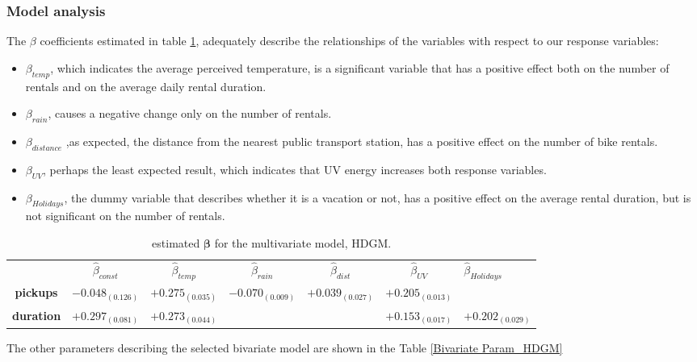 \subsubsection{Model analysis} 
The $\beta$ coefficients estimated in table \ref*{Bivariate Beta HDGM},
adequately describe the relationships of the variables with respect to our response variables:
\begin{itemize}
	\item $\beta_{temp}$, which indicates the average perceived temperature, is a significant variable that has a positive effect both on the number of rentals and on the average daily rental duration.
	\item $\beta_{rain}$, causes a negative change only on the number of rentals.
	\item $\beta_{distance}$ ,as expected, the distance from the nearest public transport station, has a positive effect on the number of bike rentals.
	\item $\beta_{UV}$, perhaps the least expected result, which indicates that UV energy increases both response variables.
	\item $\beta_{Holidays}$, the dummy variable that describes whether it is a vacation or not, has a positive effect on the average rental duration, but is not significant on the number of rentals.
\end{itemize}
\begin{table}[h!]
	\centering
	\renewcommand\arraystretch{1.3}
	\begin{tabular}{|ccccccl}
		\hline
		& $\hat{\beta}_{const}$  & $\hat{\beta}_{temp}$ & $\hat{\beta}_{rain}$ & $\hat{\beta}_{dist}$ & $\hat{\beta}_{UV}$ &$\hat{\beta}_{Holidays}$      \\ \cline{2-7} 
		\multicolumn{1}{|c|}{\textbf{pickups}}  & $-0.048_{(0.126)}$ & $+0.275_{(0.035)}$ & $-0.070_{(0.009)}$ & $+0.039_{(0.027)}$ & $+0.205_{(0.013)}$ &              \\
		\multicolumn{1}{|c|}{\textbf{duration}} & $+0.297_{(0.081)}$  & $+0.273_{(0.044)}$ &               &               & $+0.153_{(0.017)}$  & $+0.202_{(0.029)}$
	\end{tabular}
	\caption[Estimated $\boldsymbol{\beta}$ for the multivariate model (HDGM)]{estimated $\boldsymbol{\beta}$ for the multivariate model, HDGM.}
	\label{Bivariate Beta HDGM}
\end{table}
The other parameters describing the selected bivariate model are shown in the Table \ref{Bivariate Param_HDGM}
